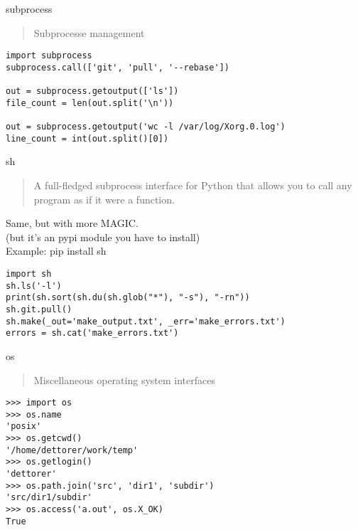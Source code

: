 \documentclass[ignorenonframetext,]{beamer}
\begin{document}
\begin{frame}[fragile]{subprocess}

    \begin{quote}
    Subprocesse management
    \end{quote}

    \begin{tcolorbox}
    \begin{verbatim}
import subprocess
subprocess.call(['git', 'pull', '--rebase'])

out = subprocess.getoutput(['ls'])
file_count = len(out.split('\n'))

out = subprocess.getoutput('wc -l /var/log/Xorg.0.log')
line_count = int(out.split()[0])
    \end{verbatim}
    \end{tcolorbox}
\end{frame}

\begin{frame}[fragile]{sh}

    \begin{quote}
        A full-fledged subprocess interface for Python that allows you to call any program as if it were a function.
    \end{quote}

    Same, but with more MAGIC.\\
    (but it's an pypi module you have to install)\\
    Example: pip install sh

    \begin{tcolorbox}
    \begin{verbatim}
import sh
sh.ls('-l')
print(sh.sort(sh.du(sh.glob("*"), "-s"), "-rn"))
sh.git.pull()
sh.make(_out='make_output.txt', _err='make_errors.txt')
errors = sh.cat('make_errors.txt')
    \end{verbatim}
    \end{tcolorbox}
\end{frame}

\begin{frame}[fragile]{os}

    \begin{quote}
    Miscellaneous operating system interfaces
    \end{quote}

    \begin{tcolorbox}
    \begin{verbatim}
>>> import os
>>> os.name
'posix'
>>> os.getcwd()
'/home/dettorer/work/temp'
>>> os.getlogin()
'dettorer'
>>> os.path.join('src', 'dir1', 'subdir')
'src/dir1/subdir'
>>> os.access('a.out', os.X_OK)
True
    \end{verbatim}
    \end{tcolorbox}
\end{frame}
\end{document}
